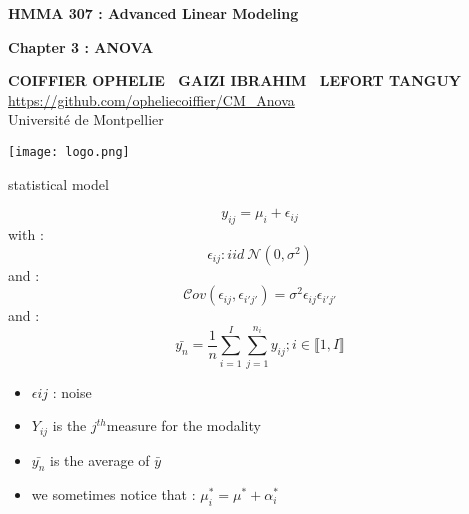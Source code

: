 \documentclass[unknownkeysallowed]{beamer}
\begin{document}



\begin{frame}
\bigskip
\bigskip
\begin{center}{
\LARGE\color{marron}
\textbf{HMMA 307 : Advanced Linear Modeling}
\textbf{ }\\
\vspace{0.5cm}
}

\color{marron}
\textbf{Chapter 3 : ANOVA}
\end{center}

\vspace{0.5cm}

\begin{center}
\textbf{COIFFIER OPHELIE \ GAIZI IBRAHIM \ LEFORT TANGUY } \\
\vspace{0.1cm}
\url{https://github.com/opheliecoiffier/CM_Anova}\\
\vspace{0.5cm}
Université de Montpellier \\
\end{center}

\centering
\texttt{[image: logo.png]}

\end{frame}
\begin{frame}
\begin{alertblock}{statistical model}

$$
y_{ij}=\mu_i+\epsilon_{ij}
$$
with : $$ \epsilon_{ij} : iid ~\mathcal{N}(0,\sigma^2) $$
and : $$\mathcal{C}ov(\epsilon_{ij},\epsilon_{i'j'})=\sigma^2 \epsilon_{ij} \epsilon_{i'j'} $$
and : $$\bar{y_n}= \frac{1}{n} \sum\limits_{i=1}^I \sum\limits_{j=1}^{n_i}y_{ij} ; i\in \llbracket 1,I \rrbracket $$
 \begin{itemize}
        \item $\epsilon{ij}$ : noise
        \item $Y_{ij}$ is the $j^{th}$measure for the modality
        \item $\bar{y_n}$ is the average of $\bar{y}$
        \item we sometimes notice that : $\mu^*_i=\mu^*+\alpha^*_i $
    \end{itemize}
\end{alertblock}
\vspace{0.4cm}
\end{frame}
\end{document}
